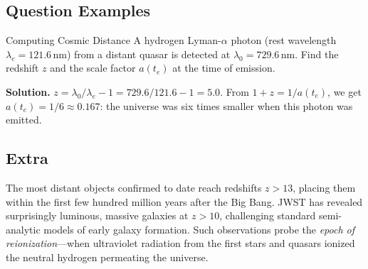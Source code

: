 \subsection{Question Examples}

\begin{example}{Computing Cosmic Distance}{}
A hydrogen Lyman-$\alpha$ photon (rest wavelength $\lambda_e = 121.6\,\mathrm{nm}$)
from a distant quasar is detected at $\lambda_0 = 729.6\,\mathrm{nm}$.
Find the redshift $z$ and the scale factor $a(t_e)$ at the time of emission.

\medskip\textbf{Solution.}\quad
$z = \lambda_0/\lambda_e - 1 = 729.6/121.6 - 1 = 5.0$.
From $1+z = 1/a(t_e)$, we get $a(t_e) = 1/6 \approx 0.167$:
the universe was six times smaller when this photon was emitted.
\end{example}

\subsection{Extra}

\begin{extra}
The most distant objects confirmed to date reach redshifts $z > 13$, placing them
within the first few hundred million years after the Big Bang.
JWST has revealed surprisingly luminous, massive galaxies at $z > 10$, challenging
standard semi-analytic models of early galaxy formation.
Such observations probe the \emph{epoch of reionization}—when ultraviolet radiation
from the first stars and quasars ionized the neutral hydrogen permeating the universe.
\end{extra}

\clearpage
